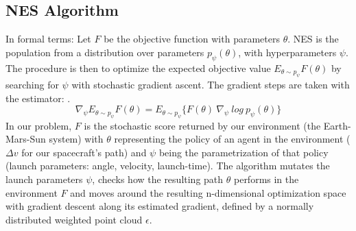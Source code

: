 \subsection{NES Algorithm}
In formal terms: Let \(F\) be the objective function with parameters \(\theta\). NES is the population from a distribution over parameters \(p_\psi (\theta)\), with hyperparameters \(\psi\). The procedure is then to optimize the expected objective value \(E_{\theta \sim p_\psi} F(\theta)\) by searching for \(\psi\) with stochastic gradient ascent. The gradient steps are taken with the estimator: \cite{Salimans2017}.
\begin{equation}
    \nabla_\psi E_{\theta \sim p_\psi} F(\theta)
    = E_{\theta \sim p_\psi} \{F(\theta)~\nabla_\psi~log~p_\psi(\theta)\}
\end{equation}
In our problem, \(F\) is the stochastic score returned by our environment (the Earth-Mars-Sun system) with \(\theta\) representing the policy of an agent in the environment ($\Delta v$ for our spacecraft's path) and \(\psi\) being the parametrization of that policy (launch parameters: angle, velocity, launch-time). The algorithm mutates the launch parameters \(\psi\), checks how the resulting path \(\theta\) performs in the environment \(F\) and moves around the resulting n-dimensional optimization space with gradient descent along its estimated gradient, defined by a normally distributed weighted point cloud \(\epsilon\).

